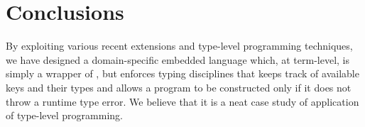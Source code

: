
\section{Conclusions}
\label{sec:conclusions}

By exploiting various recent extensions and type-level programming techniques,
we have designed a domain-specific embedded language \Edis{} which, at
term-level, is simply a wrapper of \Hedis{}, but enforces typing disciplines that keeps track of available keys and their types and allows a program to be
constructed only if it does not throw a runtime type error. We believe that it
is a neat case study of application of type-level programming.



